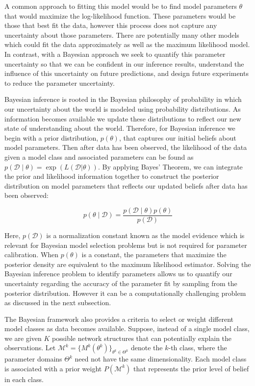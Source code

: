 \documentclass[1p]{article}
\begin{document}
A common approach to fitting this model would be to find model parameters $\theta$ that would maximize the log-likelihood function. These parameters would be those that best fit the data, however this process does not capture any uncertainty about those parameters. There are potentially many other models which could  fit the data approximately as well as the maximum likelihood model. In contrast, with a Bayesian approach we seek to quantify this parameter uncertainty so that we can be confident in our inference results, understand the influence of this uncertainty on future predictions, and design future experiments to reduce the parameter uncertainty.

Bayesian inference is rooted in the Bayesian philosophy of probability in which our uncertainty about the world is modeled using probability distributions. As information becomes available we update these distributions to reflect our new state of understanding about the world. Therefore, for Bayesian inference we begin with a prior distribution, $p \left ( \theta \right )$, that captures our initial beliefs about model parameters. Then after data has been observed, the likelihood of the data given a model class and associated parameters can be found as $p \left (\mathcal{D} \mid \theta \right ) = \exp({L}(\mathcal{D} \vert \theta))$. By applying Bayes' Theorem, we can integrate the prior and likelihood information together to construct the posterior distribution on model parameters that reflects our updated beliefs after data has been observed:

\begin{equation}
  \label{eq:Bayes}
  p \left ( \theta \mid \mathcal{D} \right ) = \frac{p \left (\mathcal{D} \mid \theta \right )p \left ( \theta \right )}{p \left ( \mathcal{D} \right )}
\end{equation}

Here, $p \left ( \mathcal{D} \right )$ is a normalization constant known as the model evidence which is relevant for Bayesian model selection problems but is not required for parameter calibration. When $p \left ( \theta \right )$ is a constant, the parameters that maximize the posterior density are equivalent to the maximum likelihood estimator. Solving the Bayesian inference problem to identify parameters allows us to quantify our uncertainty regarding the accuracy of the parameter fit by sampling from the posterior distribution. However it can be a computationally challenging problem as discussed in the next subsection.

The Bayesian framework also provides a criteria to select or weight different model classes as data becomes available. Suppose, instead of a single model class, we are given $K$ possible network structures that can potentially explain the observations. Let $\mathcal{M}^k = \{M^k(\theta^k)\}_{\theta^k \in \Theta^k}$ denote the $k$-th class, where the parameter domains $\Theta^k$ need not have the same dimensionality. Each model class is associated with a prior weight $P(\mathcal{M}^k)$ that represents the prior level of belief in each class.
\end{document}
